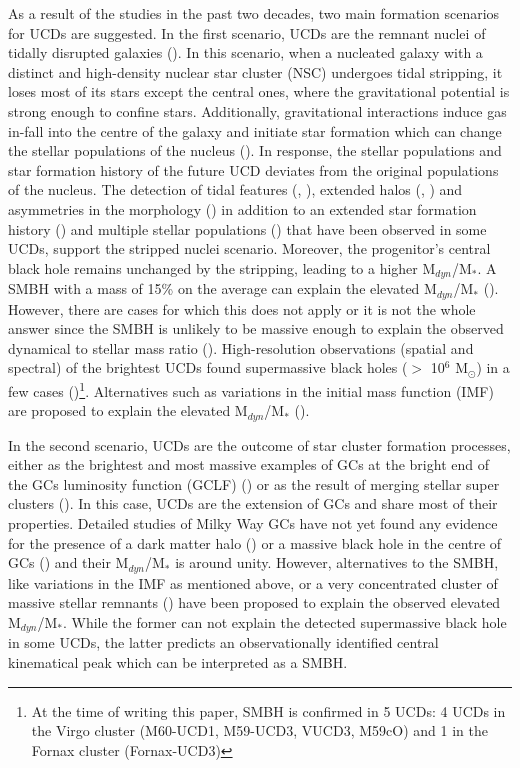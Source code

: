 \documentclass[fleqn,usenatbib]{mnras}
\begin{document}
As a result of the studies in the past two decades, two main formation scenarios for UCDs are suggested. In the first scenario, UCDs are the remnant nuclei of tidally disrupted galaxies (\citealp{Bekki-2003}). In this scenario, when a nucleated galaxy with a distinct and high-density nuclear star cluster (NSC) undergoes tidal stripping, it loses most of its stars except the central ones, where the gravitational potential is strong enough to confine stars. Additionally, gravitational interactions induce gas in-fall into the centre of the galaxy and initiate star formation which can change the stellar populations of the nucleus (\citealp{mark,yasna2018,johnston}). In response, the stellar populations and star formation history of the future UCD deviates from the original populations of the nucleus. The detection of tidal features (\citealp{Voggel2016}, \citealp{Schweizer-2018}), extended halos (\citealp{Evstigneeva-2008}, \citealp{Liu-2020}) and asymmetries in the morphology (\citealp{wittmann-2016}) in addition to an extended star formation history (\citealp{Norris-2015}) and multiple stellar populations (\citealp{Mieske-2008,DaRocha-2011}) that have been observed in some UCDs, support the stripped nuclei scenario. Moreover, the progenitor's central black hole remains unchanged by the stripping, leading to a higher M$_{dyn}$/M$_*$. A SMBH with a mass of 15\% on the average can explain the elevated M$_{dyn}$/M$_*$ (\citealp{Mieske-2013}). However, there are cases for which this does not apply or it is not the whole answer since the SMBH is unlikely to be massive enough to explain the observed dynamical to stellar
mass ratio (\citealp{janz2015}). High-resolution observations (spatial and spectral) of the brightest UCDs found supermassive black holes ($>$ 10$^6$ M$_{\odot}$) in a few cases (\citealp{Seth-2014,ahn2017,ahn2018,afanasiev})\footnote{At the time of writing this paper, SMBH is confirmed in 5 UCDs: 4 UCDs in the Virgo cluster (M60-UCD1, M59-UCD3, VUCD3, M59cO) and 1 in the Fornax cluster (Fornax-UCD3)}. Alternatives such as variations in the initial mass function (IMF) are proposed to explain the elevated M$_{dyn}$/M$_*$ (\citealp{forbes2014,alexa,kroupa,haghi}).

In the second scenario, UCDs are the outcome of star cluster formation processes, either as the brightest and most massive examples of GCs at the bright end of the GCs luminosity function (GCLF) (\citealp{mieske2002}) or as the result of merging stellar super clusters (\citealp{Fellhauer-2002}). In this case, UCDs are the extension of GCs and share most of their properties. Detailed studies of Milky Way GCs have not yet found any evidence for the presence of a dark matter halo (\citealp{mash2005,conroy2011,iba2013}) or a massive black hole in the centre of GCs (\citealp{Baum2003b}) and their M$_{dyn}$/M$_*$ is around unity. However, alternatives to the SMBH, like variations in the IMF as mentioned above, or a very concentrated cluster of massive stellar remnants (\citealp{mahani}) have been proposed to explain the observed elevated M$_{dyn}$/M$_*$. While the former can not explain the detected supermassive black hole in some UCDs, the latter predicts an observationally identified central kinematical peak which can be interpreted as a SMBH.
\end{document}
